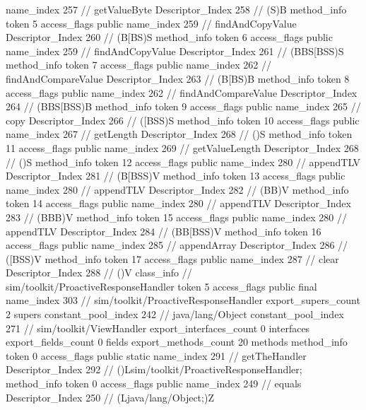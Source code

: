 {{{{{					name_index	257		// getValueByte
					Descriptor_Index	258		// (S)B
				}
				method_info {
					token	5
					access_flags	public
					name_index	259		// findAndCopyValue
					Descriptor_Index	260		// (B[BS)S
				}
				method_info {
					token	6
					access_flags	public
					name_index	259		// findAndCopyValue
					Descriptor_Index	261		// (BBS[BSS)S
				}
				method_info {
					token	7
					access_flags	public
					name_index	262		// findAndCompareValue
					Descriptor_Index	263		// (B[BS)B
				}
				method_info {
					token	8
					access_flags	public
					name_index	262		// findAndCompareValue
					Descriptor_Index	264		// (BBS[BSS)B
				}
				method_info {
					token	9
					access_flags	public
					name_index	265		// copy
					Descriptor_Index	266		// ([BSS)S
				}
				method_info {
					token	10
					access_flags	public
					name_index	267		// getLength
					Descriptor_Index	268		// ()S
				}
				method_info {
					token	11
					access_flags	public
					name_index	269		// getValueLength
					Descriptor_Index	268		// ()S
				}
				method_info {
					token	12
					access_flags	public
					name_index	280		// appendTLV
					Descriptor_Index	281		// (B[BSS)V
				}
				method_info {
					token	13
					access_flags	public
					name_index	280		// appendTLV
					Descriptor_Index	282		// (BB)V
				}
				method_info {
					token	14
					access_flags	public
					name_index	280		// appendTLV
					Descriptor_Index	283		// (BBB)V
				}
				method_info {
					token	15
					access_flags	public
					name_index	280		// appendTLV
					Descriptor_Index	284		// (BB[BSS)V
				}
				method_info {
					token	16
					access_flags	public
					name_index	285		// appendArray
					Descriptor_Index	286		// ([BSS)V
				}
				method_info {
					token	17
					access_flags	public
					name_index	287		// clear
					Descriptor_Index	288		// ()V
				}
			}
		}
		class_info {		// sim/toolkit/ProactiveResponseHandler
			token	5
			access_flags	public final
			name_index	303		// sim/toolkit/ProactiveResponseHandler
			export_supers_count	2
			supers {
				constant_pool_index	242		// java/lang/Object
				constant_pool_index	271		// sim/toolkit/ViewHandler
			}
			export_interfaces_count	0
			interfaces {
			}
			export_fields_count	0
			fields {
			}
			export_methods_count	20
			methods {
				method_info {
					token	0
					access_flags	public static
					name_index	291		// getTheHandler
					Descriptor_Index	292		// ()Lsim/toolkit/ProactiveResponseHandler;
				}
				method_info {
					token	0
					access_flags	public
					name_index	249		// equals
					Descriptor_Index	250		// (Ljava/lang/Object;)Z
}}}}}
